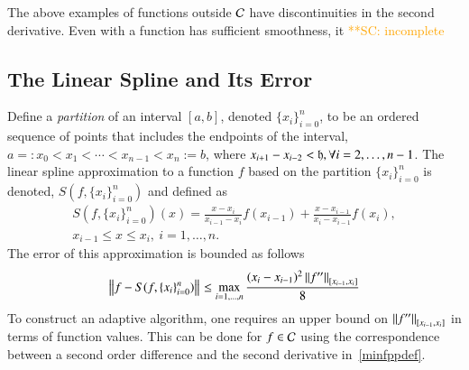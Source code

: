 \documentclass[review]{elsarticle}
\newcommand{\datasites}{\{x_i\}_{i=0}^n}
\theoremstyle{definition}
\newcommand{\scnote}[1]{ {\textcolor{orange}  {\mbox{**SC:} #1}}}
\begin{document}
The above examples of functions outside $\cc$ have discontinuities in the second
derivative. Even with a function has sufficient smoothness, it \scnote{incomplete}

\subsection{The Linear Spline and Its Error}

Define a \emph{partition} of an interval $[a, b]$, denoted $\datasites$, to be
an ordered sequence of points that includes the endpoints of the interval,
$a=:x_0 < x_1 < \cdots < x_{n-1} < x_{n}:=b$, where $x_{i+1}-x_{i-2} <\fh, \forall i=2,\ldots, n-1$.  The linear spline
approximation to a function $f$ based on the partition $\datasites$ is denoted,
$S(f,\datasites)$ and defined as
\begin{multline} \label{splinedef}
S(f,\datasites)(x) =  \frac{x-x_i}{x_{i-1} - x_i} f(x_{i-1}) + \frac{x-x_{i-1}}{x_{i} - x_{i-1}}f(x_i), \\ x_{i-1} \le x \le x_i, \ i=1, \ldots, n.
\end{multline}
The error of this approximation is bounded as follows
\begin{equation} \label{appxerrbda}
\norm{f - S(f,\datasites)} \le \max_{i=1, \ldots, n} \frac{(x_i - x_{i-1})^2\norm[{[x_{i-1},x_i]}]{f''}}{8}
\end{equation}
To construct an adaptive algorithm, one requires an upper bound on
$\norm[{[x_{i-1},x_i]}]{f''}$ in terms of function values. This can be done for
$f \in \cc$ using the correspondence between a second order difference and the
second derivative in~\eqref{minfppdef}.
\end{document}
